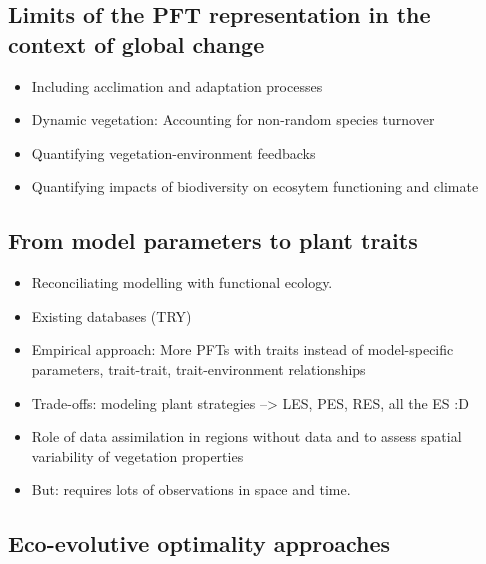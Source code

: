 \documentclass[
  oneside]{book}
\providecommand{\tightlist}{%
  \setlength{\itemsep}{0pt}\setlength{\parskip}{0pt}}
\begin{document}
\hypertarget{limits-of-the-pft-representation-in-the-context-of-global-change}{%
\subsection{Limits of the PFT representation in the context of global change}\label{limits-of-the-pft-representation-in-the-context-of-global-change}}

\begin{itemize}
\tightlist
\item
  Including acclimation and adaptation processes
\item
  Dynamic vegetation: Accounting for non-random species turnover
\item
  Quantifying vegetation-environment feedbacks
\item
  Quantifying impacts of biodiversity on ecosytem functioning and climate
\end{itemize}

\hypertarget{from-model-parameters-to-plant-traits}{%
\subsection{From model parameters to plant traits}\label{from-model-parameters-to-plant-traits}}

\begin{itemize}
\tightlist
\item
  Reconciliating modelling with functional ecology.
\item
  Existing databases (TRY)
\item
  Empirical approach: More PFTs with traits instead of model-specific parameters, trait-trait, trait-environment relationships
\item
  Trade-offs: modeling plant strategies --\textgreater{} LES, PES, RES, all the ES :D
\item
  Role of data assimilation in regions without data and to assess spatial variability of vegetation properties
\item
  But: requires lots of observations in space and time.
\end{itemize}

\hypertarget{eco-evolutive-optimality-approaches}{%
\subsection{Eco-evolutive optimality approaches}\label{eco-evolutive-optimality-approaches}}
\end{document}
